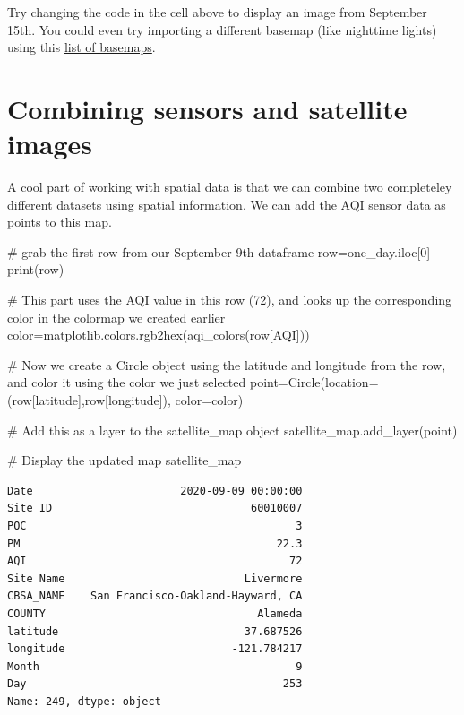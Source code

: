 \documentclass[
  letterpaper,
  DIV=11,
  numbers=noendperiod]{scrreprt}
\newenvironment{Shaded}{\begin{snugshade}}{\end{snugshade}}
\newcommand{\BuiltInTok}[1]{\textcolor[rgb]{0.00,0.23,0.31}{#1}}
\newcommand{\CommentTok}[1]{\textcolor[rgb]{0.37,0.37,0.37}{#1}}
\newcommand{\DecValTok}[1]{\textcolor[rgb]{0.68,0.00,0.00}{#1}}
\newcommand{\NormalTok}[1]{\textcolor[rgb]{0.00,0.23,0.31}{#1}}
\newcommand{\OperatorTok}[1]{\textcolor[rgb]{0.37,0.37,0.37}{#1}}
\newcommand{\StringTok}[1]{\textcolor[rgb]{0.13,0.47,0.30}{#1}}
\begin{document}
Try changing the code in the cell above to display an image from
September 15th. You could even try importing a different basemap (like
nighttime lights) using this
\href{https://ipyleaflet.readthedocs.io/en/latest/map_and_basemaps/basemaps.html}{list
of basemaps}.

\hypertarget{combining-sensors-and-satellite-images}{%
\section{Combining sensors and satellite
images}\label{combining-sensors-and-satellite-images}}

A cool part of working with spatial data is that we can combine two
completeley different datasets using spatial information. We can add the
AQI sensor data as points to this map.

\begin{Shaded}
\begin{Highlighting}[]
\CommentTok{\# grab the first row from our September 9th dataframe}
\NormalTok{row}\OperatorTok{=}\NormalTok{one\_day.iloc[}\DecValTok{0}\NormalTok{]}
\BuiltInTok{print}\NormalTok{(row)}

\CommentTok{\# This part uses the AQI value in this row (72), and looks up the corresponding color in the colormap we created earlier }
\NormalTok{color}\OperatorTok{=}\NormalTok{matplotlib.colors.rgb2hex(aqi\_colors(row[}\StringTok{\textquotesingle{}AQI\textquotesingle{}}\NormalTok{]))}

\CommentTok{\# Now we create a Circle object using the latitude and longitude from the row, and color it using the color we just selected}
\NormalTok{point}\OperatorTok{=}\NormalTok{Circle(location}\OperatorTok{=}\NormalTok{(row[}\StringTok{\textquotesingle{}latitude\textquotesingle{}}\NormalTok{],row[}\StringTok{\textquotesingle{}longitude\textquotesingle{}}\NormalTok{]), color}\OperatorTok{=}\NormalTok{color)}

\CommentTok{\# Add this as a layer to the satellite\_map object}
\NormalTok{satellite\_map.add\_layer(point)}

\CommentTok{\# Display the updated map}
\NormalTok{satellite\_map}
\end{Highlighting}
\end{Shaded}

\begin{verbatim}
Date                       2020-09-09 00:00:00
Site ID                               60010007
POC                                          3
PM                                        22.3
AQI                                         72
Site Name                            Livermore
CBSA_NAME    San Francisco-Oakland-Hayward, CA
COUNTY                                 Alameda
latitude                             37.687526
longitude                          -121.784217
Month                                        9
Day                                        253
Name: 249, dtype: object
\end{verbatim}
\end{document}
